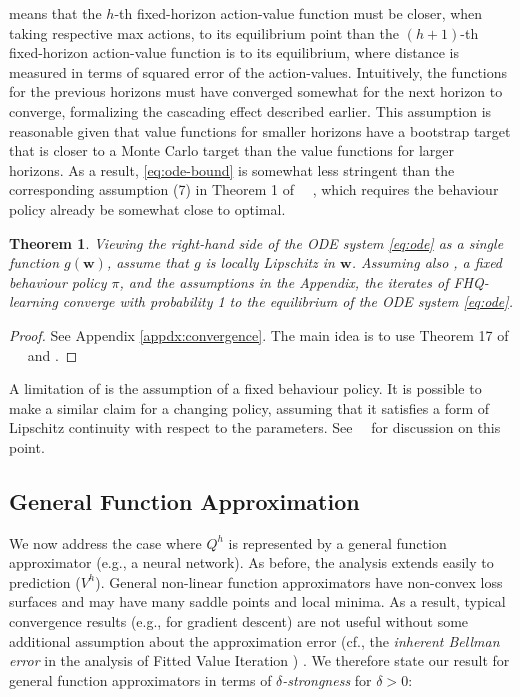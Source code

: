 \documentclass[letterpaper]{article} %
\newcommand{\val}{Q}
\newcommand{\params}{\mathbf{w}}
\newtheorem{theorem}{Theorem}
\begin{document}
\noindent {} means that the $h$-th fixed-horizon action-value function must be closer, when taking respective max actions, to its equilibrium point than the $(h + 1)$-th fixed-horizon action-value function is to its equilibrium, where distance is measured in terms of squared error of the action-values. Intuitively, the functions for the previous horizons must have converged somewhat for the next horizon to converge, formalizing the cascading effect described earlier. This assumption is reasonable given that value functions for smaller horizons have a bootstrap target that is closer to a Monte Carlo target than the value functions for larger horizons. As a result, \cref{eq:ode-bound} is somewhat less stringent than the corresponding assumption (7) in Theorem 1 of ~\citeauthor{melo2007q}~, which requires the behaviour policy already be somewhat close to optimal.

\begin{theorem}\label{thm:linearapproximation}
Viewing the right-hand side of the ODE system \cref{eq:ode} as a single function $g(\params)$, assume that $g$ is locally Lipschitz in $\params$.
Assuming also , a fixed behaviour policy $\pi$, and the assumptions in the Appendix, the iterates of FHQ-learning converge with probability 1 to the equilibrium of the ODE system \cref{eq:ode}.
\end{theorem}
\begin{proof}
See Appendix \ref{appdx:convergence}. The main idea is to use Theorem 17 of ~\citeauthor{benveniste1990stochastic}~ and .
\end{proof}

A limitation of  is the assumption of a fixed behaviour policy. It is possible to make a similar claim for a changing policy, assuming that it satisfies a form of Lipschitz continuity with respect to the parameters. See~\citeauthor{melo2007q}~ for discussion on this point.

\subsection{General Function Approximation}
We now address the case where $\val^h$ is represented by a general function approximator (e.g., a neural network). As before, the analysis extends easily to prediction ($V^h$). General non-linear function approximators have non-convex loss surfaces and may have many saddle points and local minima. As a result, typical convergence results (e.g., for gradient descent) are not useful without some additional assumption about the approximation error (cf., the \textit{inherent Bellman error} in the analysis of Fitted Value Iteration \cite{munos2008finite})%
. We therefore state our result for general function approximators in terms of \textit{$\delta$-strongness} for $\delta > 0$:
\end{document}
